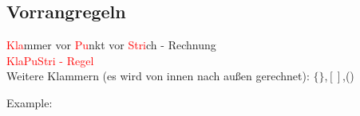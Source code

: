 \newpage
\subsection{Vorrangregeln}

\textcolor{red}{Kla}mmer vor \textcolor{red}{Pu}nkt vor \textcolor{red}{Stri}ch - Rechnung\\
\textcolor{red}{KlaPuStri - Regel}\\

\hfill \break
Weitere Klammern (es wird von innen nach außen gerechnet): $\{\}$,$[]$,()

\hfill \break
Example:\\
\fboxrule=0.8pt \\